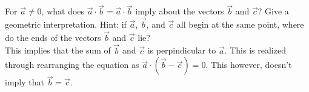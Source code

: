 For $\vec{a} \neq 0$, what does $\vec{a}\cdot \vec{b} = \vec{a}\cdot \vec{b}$ imply about the vectors $\vec{b}$ and $\vec{c}$? Give a geometric interpretation. Hint: if $\vec{a}$, $\vec{b}$, and $\vec{c}$ all begin at the same point, where do the ends of the vectors $\vec{b}$ and $\vec{c}$ lie? \\ 

\noindent This implies that the sum of $\vec{b}$ and $\vec{c}$ is perpindicular to $\vec{a}$. This is realized through rearranging the equation as $\vec{a}\cdot\left(\vec{b}-\vec{c}\right)=0$. This however, doesn't imply that $\vec{b}=\vec{c}$.
